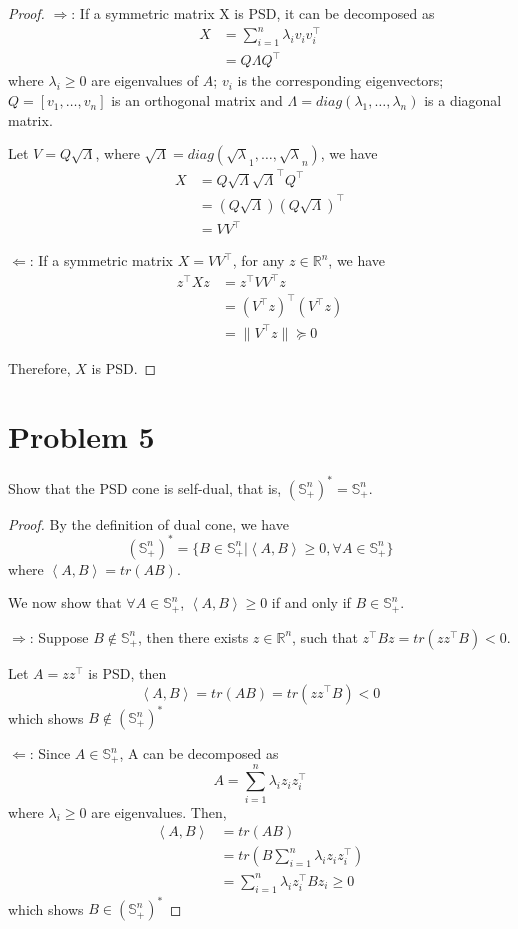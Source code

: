 \documentclass[11pt]{article}
\newcommand{\RR}{\mathbb{R}}
\newcommand{\bS}{\mathbb{S}}
\newcommand{\T}{^\top}
\begin{document}
\begin{proof}
    $\Rightarrow$: If a symmetric matrix X is PSD, it can be decomposed as
    \begin{align*}
        X &= \sum_{i=1}^{n} \lambda_i v_i v_i\T\\
        & = Q\Lambda Q\T
    \end{align*}
    where $\lambda_i \geq 0$ are eigenvalues of $A$; $v_i$ is the corresponding eigenvectors; $Q = [v_1, \dots, v_n]$ is an orthogonal matrix and $\Lambda = diag(\lambda_1, \dots, \lambda_n)$ is a diagonal matrix.

    Let $V =  Q \sqrt{\Lambda}$, where $\sqrt{\Lambda}= diag(\sqrt\lambda_1, \dots, \sqrt\lambda_n)$, we have
    \begin{align*}
        X &= Q  \sqrt{\Lambda}  \sqrt{\Lambda}\T Q\T\\
        &=(Q \sqrt{\Lambda})(Q \sqrt{\Lambda})\T\\
        &=V V\T
    \end{align*}

    $\Leftarrow$: If a symmetric matrix $X=VV\T$, for any $z\in\RR^n$, we have
    \begin{align*}
        z\T Xz &= z\T VV\T z\\
        &= (V\T z)\T(V\T z)\\
        &= \|V\T z\| \succeq 0
    \end{align*}

    Therefore, $X$ is PSD.
\end{proof}

\clearpage
\section*{Problem 5}
Show that the PSD cone is self-dual, that is, $(\bS_{+}^n)^* = \bS_{+}^n$.

\begin{proof}
    By the definition of dual cone, we have
    $$
    (\bS_{+}^n)^* = \{B \in \bS^n_{+}| \left<A, B\right> \geq 0, \forall A\in \bS^n_{+}\}
    $$
    where $\left<A, B\right> = tr(AB)$.

    We now show that $\forall A\in \bS^n_{+}$, $\left<A, B\right> \geq 0$ if and only if $B \in \bS^n_{+}$.

    $\Rightarrow$:
    Suppose $B\notin \bS^n_{+}$, then there exists $z\in\RR^n$, such that
    $ z\T Bz = tr(zz\T B) < 0 $. 
    
    Let $A = z z\T$ is PSD, then
    $$
    \left<A, B\right> = tr(AB) = tr(zz\T B) < 0
    $$
    which shows $B\notin (\bS^n_{+})^*$

    $\Leftarrow$:
    Since $A\in \bS^n_{+}$, A can be decomposed as 
    $$A = \sum_{i=1}^{n}\lambda_i z_i z_i\T$$
    where $\lambda_i \geq 0$ are eigenvalues.
    Then, 
    \begin{align*}
        \left<A, B\right> 
        &= tr(AB) \\
        &= tr(B\sum_{i=1}^{n}\lambda_i z_i z_i\T)\\
        &= \sum_{i=1}^{n}\lambda_i z_i\T B z_i \geq 0
    \end{align*}
    which shows $B\in (\bS^n_{+})^*$

\end{proof}
\end{document}
